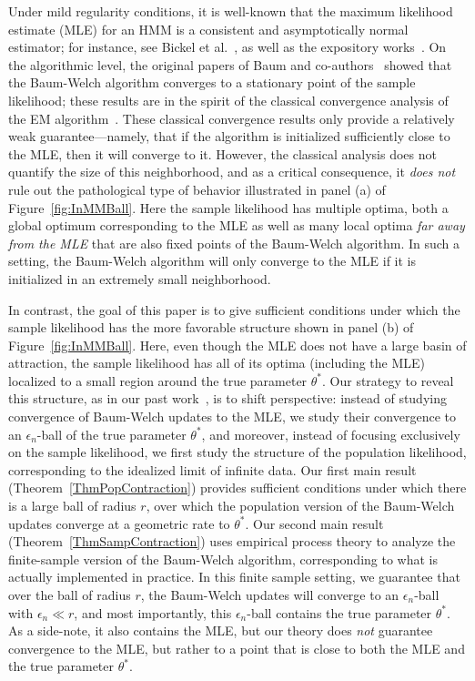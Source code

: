 \documentclass[twoside,11pt]{article}
\newcommand{\numobs}{\ensuremath{n}}
\newcommand{\thetastar}{\ensuremath{\theta^*}}
\begin{document}
Under mild regularity conditions, it is well-known that the maximum
likelihood estimate (MLE) for an HMM is a consistent and
asymptotically normal estimator; for instance, see Bickel et
al.~\citep{bickel1998}, as well as the expository
works~\citep{Moulines_HMM, vanHandel_HMM}. 
On the algorithmic level,
the original papers of Baum and co-authors~\citep{Baum70, baum1966}
showed that the Baum-Welch algorithm converges to a stationary point
of the sample likelihood; these results are in the spirit of the
classical convergence analysis of the EM algorithm~\citep{Wu83,
  Dempster77}.  These classical convergence results only provide a
relatively weak guarantee---namely, that if the algorithm is
initialized sufficiently close to the MLE, then it will converge to
it.  However, the classical analysis does not quantify the size of
this neighborhood, and as a critical consequence, it \emph{does not}
rule out the pathological type of behavior illustrated in panel (a) of
Figure~\ref{fig:InMMBall}.  Here the sample likelihood has multiple
optima, both a global optimum corresponding to the MLE as well as many
local optima \emph{far away from the MLE} that are also fixed points
of the Baum-Welch algorithm.  In such a setting, the Baum-Welch
algorithm will only converge to the MLE if it is initialized in an
extremely small neighborhood.

In contrast, the goal of this paper is to give sufficient conditions
under which the sample likelihood has the more favorable structure
shown in panel (b) of Figure~\ref{fig:InMMBall}.  Here, even though
the MLE does not have a large basin of attraction, the sample
likelihood has all of its optima (including the MLE) localized to a
small region around the true parameter $\thetastar$.  Our strategy to
reveal this structure, as in our past work~\citep{BalWaiYu14}, is to
shift perspective: instead of studying convergence of Baum-Welch
updates to the MLE, we study their convergence to an
$\epsilon_\numobs$-ball of the true parameter $\thetastar$, and
moreover, instead of focusing exclusively on the sample likelihood, we
first study the structure of the population likelihood, corresponding
to the idealized limit of infinite data.  Our first main result
(Theorem~\ref{ThmPopContraction}) provides sufficient conditions under
which there is a large ball of radius $r$, over which the population
version of the Baum-Welch updates converge at a geometric rate to
$\thetastar$.  Our second main result
(Theorem~\ref{ThmSampContraction}) uses empirical process theory to
analyze the finite-sample version of the Baum-Welch algorithm,
corresponding to what is actually implemented in practice.  In this
finite sample setting, we guarantee that over the ball of radius $r$,
the Baum-Welch updates will converge to an $\epsilon_\numobs$-ball
with $\epsilon_\numobs \ll r$, and most importantly, this
$\epsilon_\numobs$-ball contains the true parameter $\thetastar$.  As
a side-note, it also contains the MLE, but our theory does \emph{not}
guarantee convergence to the MLE, but rather to a point that is close
to both the MLE and the true parameter $\thetastar$.
\end{document}
